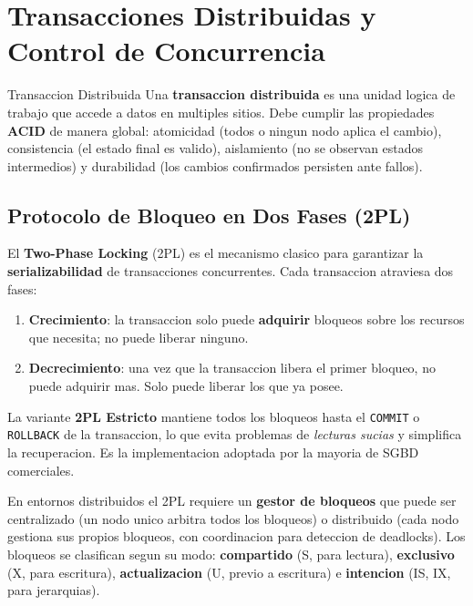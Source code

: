 \documentclass[11pt,a4paper]{article}
\begin{document}
\section{Transacciones Distribuidas y Control de Concurrencia}

\begin{defbox}{Transaccion Distribuida}
Una \textbf{transaccion distribuida} es una unidad logica de trabajo que accede a datos en multiples sitios. Debe cumplir las propiedades \textbf{ACID} de manera global: atomicidad (todos o ningun nodo aplica el cambio), consistencia (el estado final es valido), aislamiento (no se observan estados intermedios) y durabilidad (los cambios confirmados persisten ante fallos).
\end{defbox}

\subsection{Protocolo de Bloqueo en Dos Fases (2PL)}

El \textbf{Two-Phase Locking} (2PL) es el mecanismo clasico para garantizar la \textbf{serializabilidad} de transacciones concurrentes. Cada transaccion atraviesa dos fases:

\begin{enumerate}[label=\textbf{Fase \arabic*:},leftmargin=*]
\item \textbf{Crecimiento}: la transaccion solo puede \textbf{adquirir} bloqueos sobre los recursos que necesita; no puede liberar ninguno.
\item \textbf{Decrecimiento}: una vez que la transaccion libera el primer bloqueo, no puede adquirir mas. Solo puede liberar los que ya posee.
\end{enumerate}

La variante \textbf{2PL Estricto} mantiene todos los bloqueos hasta el \texttt{COMMIT} o \texttt{ROLLBACK} de la transaccion, lo que evita problemas de \textit{lecturas sucias} y simplifica la recuperacion. Es la implementacion adoptada por la mayoria de SGBD comerciales.

En entornos distribuidos el 2PL requiere un \textbf{gestor de bloqueos} que puede ser centralizado (un nodo unico arbitra todos los bloqueos) o distribuido (cada nodo gestiona sus propios bloqueos, con coordinacion para deteccion de deadlocks). Los bloqueos se clasifican segun su modo: \textbf{compartido} (S, para lectura), \textbf{exclusivo} (X, para escritura), \textbf{actualizacion} (U, previo a escritura) e \textbf{intencion} (IS, IX, para jerarquias).
\end{document}
